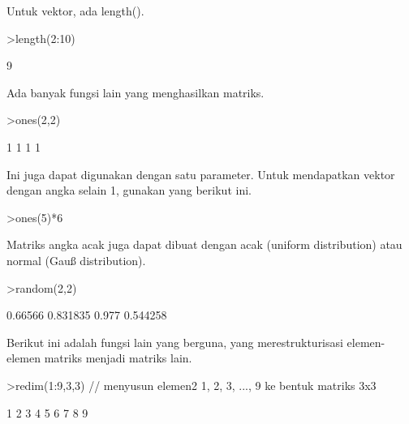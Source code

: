 \documentclass[a4paper,10pt]{article}
\begin{document}
\begin{eulernotebook}
\begin{eulercomment}
Untuk vektor, ada length().
\end{eulercomment}
\begin{eulerprompt}
>length(2:10)
\end{eulerprompt}
\begin{euleroutput}
  9
\end{euleroutput}
\begin{eulercomment}
Ada banyak fungsi lain yang menghasilkan matriks.
\end{eulercomment}
\begin{eulerprompt}
>ones(2,2)
\end{eulerprompt}
\begin{euleroutput}
              1             1 
              1             1 
\end{euleroutput}
\begin{eulercomment}
Ini juga dapat digunakan dengan satu parameter. Untuk mendapatkan
vektor dengan angka selain 1, gunakan yang berikut ini.
\end{eulercomment}
\begin{eulerprompt}
>ones(5)*6
\end{eulerprompt}
\begin{euleroutput}
  [6,  6,  6,  6,  6]
\end{euleroutput}
\begin{eulercomment}
Matriks angka acak juga dapat dibuat dengan acak (uniform
distribution) atau normal (Gauß distribution).
\end{eulercomment}
\begin{eulerprompt}
>random(2,2)
\end{eulerprompt}
\begin{euleroutput}
        0.66566      0.831835 
          0.977      0.544258 
\end{euleroutput}
\begin{eulercomment}
Berikut ini adalah fungsi lain yang berguna, yang merestrukturisasi
elemen-elemen matriks menjadi matriks lain.
\end{eulercomment}
\begin{eulerprompt}
>redim(1:9,3,3) // menyusun elemen2 1, 2, 3, ..., 9 ke bentuk matriks 3x3
\end{eulerprompt}
\begin{euleroutput}
              1             2             3 
              4             5             6 
              7             8             9 
\end{euleroutput}
\begin{eulercomment}

\end{eulercomment}
\end{eulernotebook}
\end{document}
